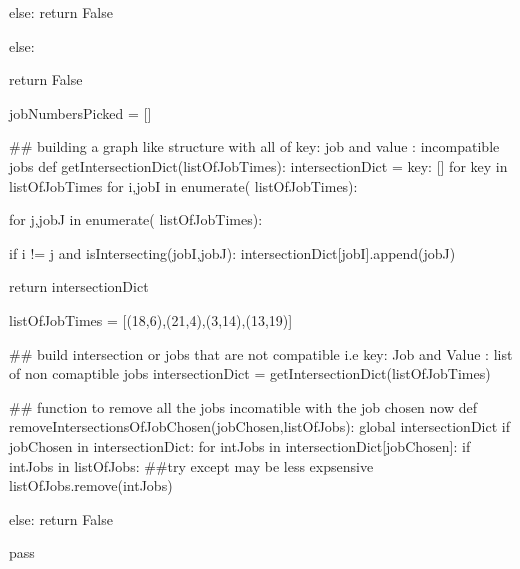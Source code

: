 \documentclass[11pt]{article}
\begin{document}
        else:
            return False
        
    else:
        
        return False
    
jobNumbersPicked = []

## building a graph like structure with all of key: job and value : incompatible jobs
def getIntersectionDict(listOfJobTimes):
    intersectionDict = {key: [] for key in listOfJobTimes}
    for i,jobI in enumerate( listOfJobTimes):
        
        for j,jobJ in enumerate( listOfJobTimes):
            
            if i != j and isIntersecting(jobI,jobJ):
                intersectionDict[jobI].append(jobJ)
                
            
    return intersectionDict

listOfJobTimes = [(18,6),(21,4),(3,14),(13,19)]


## build intersection or jobs that are not compatible i.e key: Job and Value : list of non comaptible jobs
intersectionDict = getIntersectionDict(listOfJobTimes)

## function to remove all the jobs incomatible with the job chosen now
def removeIntersectionsOfJobChosen(jobChosen,listOfJobs):
    global intersectionDict
    if jobChosen in intersectionDict:
        for intJobs in intersectionDict[jobChosen]:
            if intJobs in listOfJobs: ##try except may be less expsensive
                listOfJobs.remove(intJobs)
        
    else:
        return False
        
    pass
\end{document}
